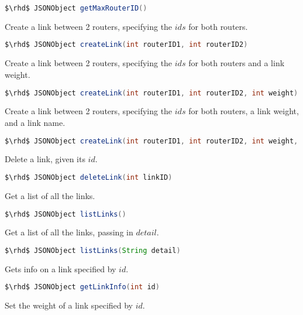 \begin{lstlisting}[language=Java]
    $\rhd$ JSONObject getMaxRouterID()
\end{lstlisting}

\noindent  Create a link between 2 routers, specifying the $ids$ for
both routers.

\begin{lstlisting}[language=Java]
    $\rhd$ JSONObject createLink(int routerID1, int routerID2)
\end{lstlisting}

\noindent   Create a link between 2 routers, specifying the $ids$ for
both routers and a link weight.

\begin{lstlisting}[language=Java]
    $\rhd$ JSONObject createLink(int routerID1, int routerID2, int weight)
\end{lstlisting}

\noindent  Create a link between 2 routers, specifying the $ids$ for
both routers, a link weight, and a link name.

\begin{lstlisting}[language=Java]
    $\rhd$ JSONObject createLink(int routerID1, int routerID2, int weight, String linkName)
\end{lstlisting}

\noindent  Delete a link, given its $id$.

\begin{lstlisting}[language=Java]
    $\rhd$ JSONObject deleteLink(int linkID)
\end{lstlisting}

\noindent  Get a list of all the links.

\begin{lstlisting}[language=Java]
    $\rhd$ JSONObject listLinks()
\end{lstlisting}

\noindent  Get a list of all the links, passing in $detail$.

\begin{lstlisting}[language=Java]
    $\rhd$ JSONObject listLinks(String detail)
\end{lstlisting}

\noindent  Gets info on a link specified by $id$.

\begin{lstlisting}[language=Java]
    $\rhd$ JSONObject getLinkInfo(int id)
\end{lstlisting}

\noindent  Set the weight of a link specified by $id$.

